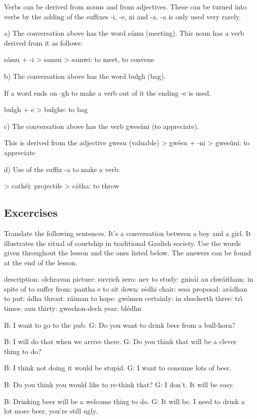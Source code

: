 Verbs can be derived from nouns and from adjectives. These can be turned into verbs by the adding of the suffixes -i, -e, ni and -a. -a is only used very rarely.

a) The conversation above has the word s\'{a}mu (meeting).
This noun has a verb derived from it as follows:

s\'{a}mu + -i > samui > samwi: to meet, to convene

b) The conversation above has the word bulgh (bag).

If a word ends on -gh to make a verb out of it the ending -e is used.

bulgh + e > bulghe: to bag

c) The conversation above has the verb gwes\'{u}ni (to appreciate).

This is derived from the adjective gwesu (valuable)
> gw\'{e}su + -ni > gwes\'{u}ni: to appreciate

d) Use of the suffix -a to make a verb:

> cath\'{e}i: projectile
> c\'{a}tha: to throw

\subsection{Excercises}

Translate the following sentences. It's a conversation between a boy and a girl. It illustrates the ritual of courtship in traditional Gaulish society. Use the words given throughout the lesson and the ones listed below. The answers can be found at the end of the lesson.

description: olchravan
picture: suvrich
zero: nev
to study: gnis\'{a}i
au chw\'{a}itham: in spite of
to suffer from: pantha e
to sit down: s\'{e}dhi
chair: sesa
proposal: ar\'{a}dhan
to put: \'{a}dha
throat: r\'{a}iman
to hope: gw\'{o}men
certainly: in shucherth
three: tr\'{\i}
times: aun
thirty: gwochon-dech
year: bl\'{e}dhn

B: I want to go to the pub.
G: Do you want to drink beer from a bull-horn?

B: I will do that when we arrive there.
G: Do you think that will be a clever thing to do?

B: I think not doing it would be stupid.
G: I want to consume lots of beer.

B: Do you think you would like to re-think that?
G: I don't. It will be easy.

B: Drinking beer will be a welcome thing to do.
G: It will be. I need to drink a lot more beer, you're still ugly.


